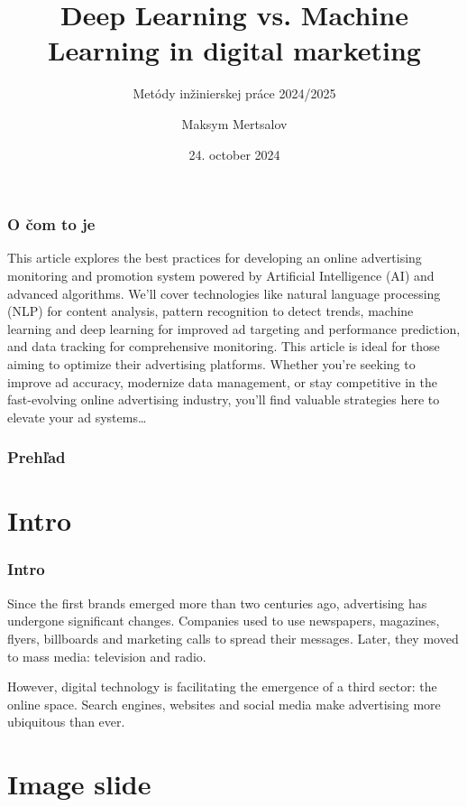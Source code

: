 \documentclass{beamer}
\author{Maksym Mertsalov}
\institute{
	Ústav informatiky, informačných systémov a softvérového inžinierstva\\
	Fakulta informatiky a informačných technológií\\
	Slovenská technická univerzita v Bratislave}
\subtitle{\vspace{3mm} Metódy inžinierskej práce 2024/2025}
\title{Deep Learning vs. Machine Learning in digital marketing}
\date{\footnotesize 24. october 2024}
\newcommand{\ssection}[1]{
	\section{#1}
	\begin{frame}[fragile=singleslide]\frametitle{}
	\Huge #1
	\end{frame}
}
\begin{document}
\begin{frame}[fragile=singleslide]
\titlepage
\end{frame}


\begin{frame}[fragile=singleslide]\frametitle{O čom to je}
This article explores the best practices for developing an online advertising monitoring and promotion system powered by Artificial Intelligence (AI) and advanced algorithms. We’ll cover technologies like natural language processing (NLP) for content analysis, pattern recognition to detect trends, machine learning and deep learning for improved ad targeting and performance prediction, and data tracking for comprehensive monitoring.
This article is ideal for those aiming to optimize their advertising platforms. Whether you're seeking to improve ad accuracy, modernize data management, or stay competitive in the fast-evolving online advertising industry, you'll find valuable strategies here to elevate your ad systems\ldots
\end{frame}


\begin{frame}[fragile=singleslide]\frametitle{Prehľad}
\tableofcontents
\end{frame}


\section{Intro}

\begin{frame}[fragile=singleslide]\frametitle{Intro}
Since the first brands emerged more than two centuries ago, advertising has undergone significant changes. Companies used to use newspapers, magazines, flyers, billboards and marketing calls to spread their messages. Later, they moved to mass media: television and radio.\par

However, digital technology is facilitating the emergence of a third sector: the online space. Search engines, websites and social media make advertising more ubiquitous than ever. \par
\end{frame}



\section{Image slide}
\end{document}
